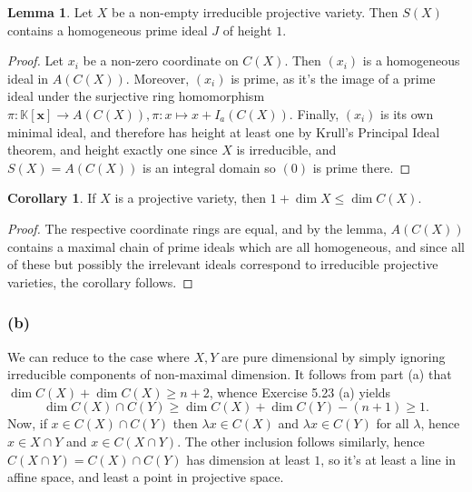 \documentclass{article}
\theoremstyle{definition}
\newtheorem{corollary}[theorem]{Corollary}
\newtheorem{lemma}[theorem]{Lemma}
\newcommand{\K}{\mathbb{K}}
\newcommand{\Kx}{\K[\bm{x}]}
\begin{document}
\begin{lemma}
	Let $X$ be a non-empty irreducible projective variety. Then $S(X)$ contains
	a homogeneous prime ideal $J$ of height $1$.
\end{lemma}
\begin{proof}
	Let $x_i$ be a non-zero coordinate on $C(X)$. Then $(x_i)$ is a homogeneous
	ideal in $A(C(X))$. Moreover, $(x_i)$ is prime, as it's the image of a
	prime ideal under the surjective ring homomorphism $\pi: \Kx \to A(C(X)),
	\pi: x \mapsto x + I_a(C(X))$. Finally, $(x_i)$ is its own minimal ideal,
	and therefore has height at least one by Krull's Principal Ideal theorem,
	and height exactly one since $X$ is irreducible, and $S(X) = A(C(X))$ is an
	integral domain so $(0)$ is prime there.
\end{proof}

\begin{corollary}
	If $X$ is a projective variety, then $1 + \dim X \leq \dim C(X)$.
\end{corollary}
\begin{proof}
	The respective coordinate rings are equal, and by the lemma, $A(C(X))$
	contains a maximal chain of prime ideals which are all homogeneous, 
	and since all of these but possibly the irrelevant ideals correspond
	to irreducible projective varieties, the corollary follows.
\end{proof}

\subsubsection*{(b)}
We can reduce to the case where $X, Y$ are pure dimensional by simply ignoring
irreducible components of non-maximal dimension. It follows from part (a) that
$\dim C(X) + \dim C(X) \geq n + 2$, whence Exercise 5.23 (a) yields
\[
	\dim C(X) \cap C(Y) \geq \dim C(X) + \dim C(Y) - (n + 1) \geq 1.
\]
Now, if $x \in C(X) \cap C(Y)$ then $\lambda x \in C(X)$ and $\lambda x \in
C(Y)$ for all $\lambda$, hence $x \in X \cap Y$ and $x \in C(X \cap Y)$. The
other inclusion follows similarly, hence $C(X \cap Y) = C(X) \cap C(Y)$ has
dimension at least $1$, so it's at least a line in affine space, and least a
point in projective space.
\end{document}
